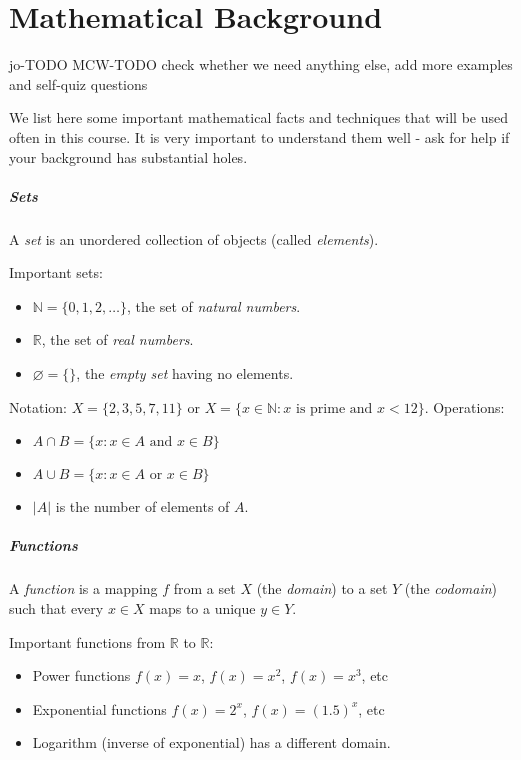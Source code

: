 \setcounter{chapter}{-1}
\chapter{Mathematical Background}
\label{ch:app:mathtools}

jo-TODO
MCW-TODO check whether we need anything else, add more examples and self-quiz questions

We list here some important mathematical facts and techniques  that will be used often in this course. It is very important to understand them well - ask for help if your background has substantial holes.

\paragraph{Sets}

A \emph{set} is an unordered collection of objects (called \emph{elements}).

Important sets: 
\begin{itemize}
\item $\mathbb{N} = \{0,1,2,\dots \}$, the set of \emph{natural numbers}.
\item $\mathbb{R}$, the set of \emph{real numbers}.
\item $\varnothing = \{\}$, the \emph{empty set} having no elements.
\end{itemize}

Notation: $X = \{2,3,5,7,11\}$ or $X = \{x\in \mathbb{N} : \text{$x$ is prime and $x< 12$}\}$.
Operations: 
\begin{itemize}
\item $A\cap B = \{x: x\in A \text{ and } x\in B\}$
\item $A\cup B = \{x: x\in A \text{ or  } x\in B\}$
\item $|A|$ is the number of elements of $A$.
\end{itemize}


\paragraph{Functions}

A \emph{function} is a mapping $f$ from a set $X$ (the \emph{domain}) to a set $Y$ (the \emph{codomain}) such that every $x\in X$ maps to a unique $y\in Y$.

Important functions from $\mathbb{R}$ to $\mathbb{R}$: 
\begin{itemize}
\item Power functions $f(x) = x$, $f(x) = x^2$, $f(x) = x^3$, etc
\item Exponential functions $f(x) = 2^x$, $f(x) = (1.5)^x$, etc
\item Logarithm (inverse of exponential) has a different domain.
\end{itemize}

